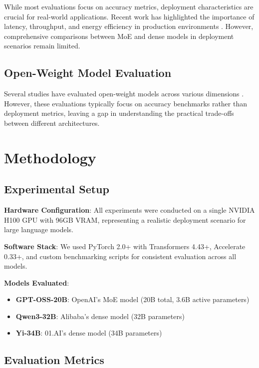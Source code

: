 \documentclass[11pt]{article}
\begin{document}
While most evaluations focus on accuracy metrics, deployment characteristics are crucial for real-world applications. Recent work has highlighted the importance of latency, throughput, and energy efficiency in production environments \cite{liu2023survey, wang2023survey}. However, comprehensive comparisons between MoE and dense models in deployment scenarios remain limited.

\subsection{Open-Weight Model Evaluation}

Several studies have evaluated open-weight models across various dimensions \cite{jiang2023mistral, team2024qwen, ai2024yi}. However, these evaluations typically focus on accuracy benchmarks rather than deployment metrics, leaving a gap in understanding the practical trade-offs between different architectures.

\section{Methodology}

\subsection{Experimental Setup}

\textbf{Hardware Configuration}: All experiments were conducted on a single NVIDIA H100 GPU with 96GB VRAM, representing a realistic deployment scenario for large language models.

\textbf{Software Stack}: We used PyTorch 2.0+ with Transformers 4.43+, Accelerate 0.33+, and custom benchmarking scripts for consistent evaluation across all models.

\textbf{Models Evaluated}:
\begin{itemize}
    \item \textbf{GPT-OSS-20B}: OpenAI's MoE model (20B total, 3.6B active parameters)
    \item \textbf{Qwen3-32B}: Alibaba's dense model (32B parameters)
    \item \textbf{Yi-34B}: 01.AI's dense model (34B parameters)
\end{itemize}

\subsection{Evaluation Metrics}
\end{document}

